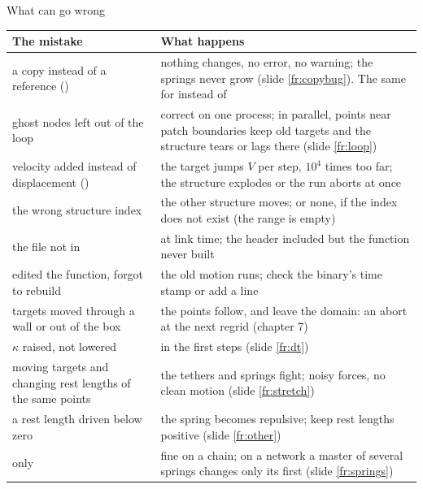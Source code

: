 \documentclass[aspectratio=169,11pt]{beamer}
\begin{document}
\begin{frame}{What can go wrong}
\label{fr:wrong}
\scriptsize
\begin{tabular}{@{}L{0.3\textwidth}L{0.62\textwidth}@{}}
\toprule
The mistake & What happens\\
\midrule
a copy instead of a reference () & nothing changes, no error, no warning; the springs never grow (slide \ref{fr:copybug}). The same for  instead of \\
ghost nodes left out of the loop & correct on one process; in parallel, points near patch boundaries keep old targets and the structure tears or lags there (slide \ref{fr:loop})\\
velocity added instead of displacement () & the target jumps $V$ per step, $10^4$ times too far; the structure explodes or the run aborts at once\\
the wrong structure index & the other structure moves; or none, if the index does not exist (the range is empty)\\
the file not in  &  at link time; the header included but the function never built\\
edited the function, forgot to rebuild & the old motion runs; check the binary's time stamp or add a  line\\
targets moved through a wall or out of the box & the points follow, and leave the domain: an abort at the next regrid (chapter 7)\\
$\kappa$ raised,  not lowered &  in the first steps (slide \ref{fr:dt})\\
moving targets and changing rest lengths of the same points & the tethers and springs fight; noisy forces, no clean motion (slide \ref{fr:stretch})\\
a rest length driven below zero & the spring becomes repulsive; keep rest lengths positive (slide \ref{fr:other})\\
 only & fine on a chain; on a network a master of several springs changes only its first (slide \ref{fr:springs})\\
\bottomrule
\end{tabular}
\end{frame}
\end{document}
